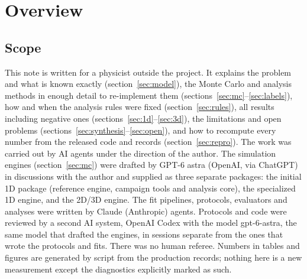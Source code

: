 \documentclass[10pt,a4paper]{article}
\begin{document}
\section{Overview}\label{sec:overview}
\subsection{Scope}
This note is written for a physicist outside the project. It explains the problem and what is known exactly (section~\ref{sec:model}), the
Monte Carlo and analysis methods in enough detail to re-implement them (sections~\ref{sec:mc}--\ref{sec:labels}), how and when the analysis
rules were fixed (section~\ref{sec:rules}), all results including negative ones (sections~\ref{sec:1d}--\ref{sec:3d}), the limitations and
open problems (sections~\ref{sec:synthesis}--\ref{sec:open}), and how to recompute every number from the released code and records
(section~\ref{sec:repro}). The work was carried out by AI agents under the direction of the author. The simulation engines (section~\ref{sec:mc}) were
drafted by GPT-6 astra (OpenAI, via ChatGPT) in discussions with the author and supplied as three separate packages: the initial 1D package (reference engine, campaign tools
and analysis core), the specialized 1D engine, and the 2D/3D engine. The fit pipelines, protocols, evaluators and analyses were written by
Claude (Anthropic) agents. Protocols and code were reviewed by a second AI system, OpenAI Codex with the model gpt-6-astra, the same model that
drafted the engines, in sessions separate from the ones that wrote the protocols and fits. There was no human referee. Numbers in tables and figures are generated by script from
the production records; nothing here is a new measurement except the diagnostics explicitly marked as such.
\end{document}
